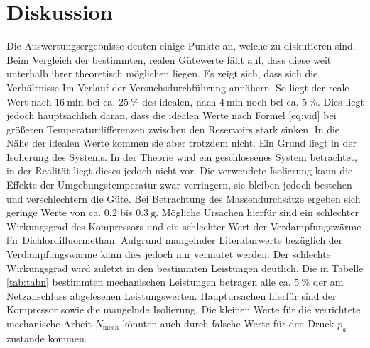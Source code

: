 
\section{Diskussion}
\label{sec:Diskussion}
Die Auswertungsergebnisse deuten einige Punkte an, welche zu diskutieren sind.
Beim Vergleich der bestimmten, realen Gütewerte fällt auf, dass diese weit
unterhalb ihrer theoretisch möglichen liegen. Es zeigt sich, dass sich die
Verhältnisse Im Verlauf der Versuchsdurchführung annähern. So liegt der reale
Wert nach $\SI{16}{\minute}$ bei ca. $\SI{25}{\percent}$ des idealen, nach
$\SI{4}{\minute}$ noch bei ca. $\SI{5}{\percent}$. Dies liegt jedoch
hauptsächlich daran, dass die idealen Werte nach Formel \ref{eq:vid} bei
größeren Temperaturdifferenzen zwischen den Reservoirs stark sinken. In die Nähe
der idealen Werte kommen sie aber trotzdem nicht. Ein Grund liegt in der Isolierung des Systems.
In der Theorie wird ein geschlossenes System betrachtet, in der Realität liegt dieses jedoch nicht
vor. Die verwendete Isolierung kann die Effekte der Umgebungstemperatur zwar
verringern, sie bleiben jedoch bestehen und verschlechtern die Güte. Bei
Betrachtung des Massendurchsätze ergeben sich geringe Werte von ca.
$\num{0.2}$ bis $\SI{0.3}{\gram}$. Mögliche Ursachen hierfür sind ein schlechter Wirkungsgrad
des Kompressors und ein schlechter Wert der Verdampfungswärme für Dichlordifluormethan.
Aufgrund mangelnder Literaturwerte bezüglich der Verdampfungswärme kann dies
jedoch nur vermutet werden. Der schlechte Wirkungsgrad wird zuletzt in den
bestimmten Leistungen deutlich. Die in Tabelle \ref{tab:tabn} bestimmten mechanischen Leistungen betragen alle ca.
$\SI{5}{\percent}$ der am Netzanschluss abgelesenen Leistungswerten. Hauptursachen
 hierfür sind der Kompressor sowie die mangelnde Isolierung. Die kleinen Werte für die verrichtete mechanische Arbeit $N_\text{mech}$ könnten auch durch falsche Werte für den Druck $p_a$ zustande kommen.
 
